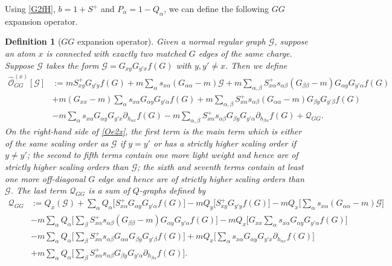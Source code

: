 \documentclass{article}
\newcommand{\1}{\mathds{1}}
\numberwithin{equation}{section}
\newcommand{\al}{\alpha}
\renewcommand{\cal}{\mathcal}
\newcommand{\wh}{\widehat}
\theoremstyle{plain} %
\newtheorem{definition}[theorem]{Definition}
\theoremstyle{remark}
\begin{document}
Using \eqref{G2fH}, $b =1 + S^+ $ and $P_\al=1-Q_\al$, we can define the following $G G$ expansion operator. 
   \begin{definition}[$G G$ expansion operator] \label{GG-def}
  Given a normal regular graph $\cal G$, suppose an atom $x$ is connected with exactly two matched $G$ edges of the same charge. Suppose $\cal G$ takes the form $\cal G=G_{xy}   G_{y' x } f(G)$ with $y,y' \ne x$. Then we define
\begin{align}
  \wh{\cal O}_{GG}^{(x)} [\cal G] & := %
m S^{+}_{xy} G_{y' y} f(G)  + m \sum_\al  s_{x\al} (G_{\al \al}-m) \cal G + m \sum_{\al,\beta}  S^{+}_{x\al}  s_{\al\beta} (G_{\beta \beta}-m) G_{\al y}   G_{y'\al} f(G) \nonumber \\
    &  + m(G_{xx }-m)   \sum_\al s_{x\al}G_{\al y}   G_{y'\al} f(G) + m \sum_{\al,\beta}  S^+_{x\al} s_{\al\beta}  (G_{\al\al }-m) G_{\beta y}   G_{y'\beta} f(G)  \nonumber\\
    & - m \sum_{ \al}  s_{x\al}G_{\al y} G_{y' x} \partial_{ h_{\al x}}f(G) - m \sum_{\al,\beta} S^{+}_{x\al} s_{\al\beta}G_{\beta y} G_{y' \al} \partial_{ h_{\beta \al}}f(G) + \cal Q_{GG} .\label{Oe2x}
    \end{align}
On the right-hand side of \eqref{Oe2x}, the first term is the main term which is either of the same scaling order as $\cal G$ if $y=y'$ or has a strictly higher scaling order if $y\ne y'$; the second to fifth terms contain one more light weight and hence are of strictly higher scaling orders than $\cal G$; the sixth and seventh terms contain at least one more off-diagonal $G$ edge and hence are of strictly higher scaling orders than $\cal G$. The last term $\cal Q_{GG} $ is a sum of $Q$-graphs defined by
    \begin{align}
  \cal Q_{GG}&:=  Q_x \left(\cal G\right)+  \sum_\al Q_\al\Big[ S^+_{x\al}  G_{\al y}   G_{y'\al} f(G) \Big]  - m Q_y\Big[S^{+}_{xy}  G_{y' y} f(G)\Big] - m Q_x\Big[\sum_\al  s_{x\al} (G_{\al\al}-m) \cal G\Big]  \nonumber\\
   &- m \sum_\al Q_\al\Big[\sum_{ \beta}  S^{+}_{x\al}  s_{\al\beta} (G_{\beta \beta}-m)G_{\al y}   G_{y'\al} f(G)\Big] - mQ_x\Big[ G_{xx }  \sum_\al s_{x\al} G_{\al y}   G_{y'\al} f(G)\Big] \nonumber\\
&- m\sum_\al Q_\al\Big[ \sum_{ \beta}  S^{+}_{x\al}  s_{\al\beta} G_{\al\al }  G_{\beta y}   G_{y'\beta} f(G)\Big]  + m Q_x\Big[\sum_{ \al}  s_{x\al} G_{\al y} G_{y' x} \partial_{ h_{ \al x}}f(G)\Big] \\
& + m\sum_\al Q_\al\Big[ \sum_{\beta} S^{+}_{x\al} s_{\al\beta}G_{\beta y} G_{y' \al} \partial_{h_{\beta \al}}f (G)\Big] .\nonumber 

\end{align}
\end{definition}
\end{document}
